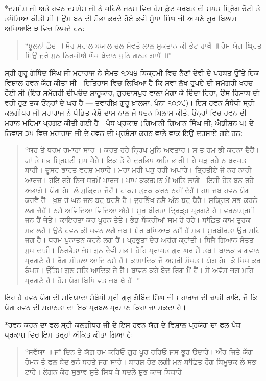 \documentclass[12pt,a5paper,twoside]{book}  %
\makeatletter
\renewcommand\section{\@startsection{section}{1}{0pt}{1.2em}{0.6em}{\punjabifont\Large\bfseries}}%
\makeatother
\begin{document}
{\section*{ਦਸਮੇਸ਼ ਜੀ ਅਤੇ ਹਵਨ}
ਦਸਮੇਸ਼ ਜੀ ਨੇ ਪਹਿਲੇ ਜਨਮ ਵਿਚ ਹੇਮ ਕੁੰਟ ਪਰਬਤ ਦੀ ਸਪਤ ਸ੍ਰਿੰਗ ਚੋਟੀ ਤੇ ਤਪੱਸਿਆ ਕੀਤੀ ਸੀ। ਉਸ ਬਨ ਦੀ ਸ਼ੋਭਾ ਕਰਦੇ ਹੋਏ ਕਵੀ ਸੁੱਖਾ ਸਿੰਘ ਜੀ ਆਪਣੇ ਗੁਰ ਬਿਲਾਸ ਅਧਿਆਇ ੩ ਵਿਚ ਲਿਖਦੇ ਹਨ:
\begin{quote}
“ਝੂਲਨਾਂ ਛੰਦ ॥ ਮੋਰ ਮਰਾਲ ਬਯਾਲ ਚਲ ਸੇਵਤੇ ਲਾਲ ਮੁਕਤਾਨ ਕੀ ਭੇਟ ਰਾਖੈਂ ॥ ਹੋਮ ਯੱਗ ਘ੍ਰਿਤ ਸਿਉਂ ਜੁਰੇ ਮੁਨ ਨਿਰਖੀਐ ਘੋਖ ਬੇਦਾਨ ਧੁਨਿ ਗਨਤ ਗਾਖੈਂ ॥”
\end{quote}
ਸ੍ਰੀ ਗੁਰੂ ਗੋਬਿੰਦ ਸਿੰਘ ਜੀ ਮਹਾਰਾਜ ਨੇ ਸੰਮਤ ੧੭੫੪ ਬਿਕ੍ਰਮੀ ਵਿਚ ਨੈਣਾਂ ਦੇਵੀ ਦੇ ਪਰਬਤ ਉੱਤੇ ਇਕ ਵਿਸ਼ਾਲ ਹਵਨ ਯੱਗ ਕੀਤਾ ਸੀ। ਇਤਿਹਾਸ ਵਿਚ ਲਿਖਿਆ ਹੈ ਕਿ ਸਵਾ ਲੱਖ ਰੁਪਏ ਦੀ ਸਮੱਗਰੀ ਖਰਚ ਹੋਈ ਸੀ (ਇਹ ਸਮੱਗਰੀ ਦੀਪਚੰਦ ਸ਼ਾਹੂਕਾਰ, ਗੁਰਦਾਸਪੁਰ ਵਾਲਾ ਮੰਗਾ ਕੇ ਦਿੰਦਾ ਰਿਹਾ, ਉਸ ਹਿਸਾਬ ਦੀ ਵਹੀ ਹੁਣ ਤਕ ਉਨ੍ਹਾਂ ਦੇ ਘਰ ਹੈ — ਤਵਾਰੀਖ਼ ਗੁਰੂ ਖ਼ਾਲਸਾ, ਪੰਨਾ ੧੦੭੯)। ਇਸ ਹਵਨ ਸੰਬੰਧੀ ਸ੍ਰੀ ਕਲਗੀਧਰ ਜੀ ਮਹਾਰਾਜ ਨੇ ਪੰਡਿਤ ਕੇਸ਼ੋ ਦਾਸ ਨਾਲ ਜੋ ਬਚਨ ਬਿਲਾਸ ਕੀਤੇ, ਉਨ੍ਹਾਂ ਵਿਚ ਹਵਨ ਦੀ ਮਹਾਨ ਮਹਿਮਾ ਪ੍ਰਗਟ ਕੀਤੀ ਗਈ ਹੈ। ਪੰਥ ਪ੍ਰਕਾਸ਼ (ਗਿਆਨੀ ਗਿਆਨ ਸਿੰਘ ਜੀ, ਐਡੀਸ਼ਨ ੫) ਦੇ ਨਿਵਾਸ ੨੫ ਵਿਚ ਮਹਾਰਾਜ ਜੀ ਦੇ ਹਵਨ ਦੀ ਪ੍ਰਸ਼ੰਸਾ ਕਰਨ ਵਾਲੇ ਵਾਕ ਇਉਂ ਦਰਸਾਏ ਗਏ ਹਨ:
\begin{quote}
“ਯਹ ਤੋ ਧਰਮ ਹਮਾਰਾ ਸਾਰ । ਕਰਤ ਰਹੇ ਨ੍ਰਿਪ ਮੁਨਿ ਅਵਤਾਰ। ਸੋ ਤੋ ਹਮ ਭੀ ਕਰਨਾ ਚੈਹੈਂ। ਯਾਂ ਤੇ ਸਭ ਸ੍ਰਿਸ਼ਟੀ ਸੁਖ ਪੈਹੈ। ਇਕ ਤੋ ਹੈ ਦੁਰਭਿਖ ਅਤਿ ਭਾਰੀ। ਹੈ ਪੜੁ ਰਹੈ ਨ ਬਰਖਤ ਬਾਰੀ। ਦੂਸਰ ਭਾਰਤ ਵਰਸ਼ ਮਝਾਰੇ। ਮਹਾ ਮਰੀ ਪੜੁ ਰਹੀ ਅਪਾਰੇ। ਤ੍ਰਿਤੀਏ ਜੋ ਨਰ ਨਾਰੀ ਆਰਜ। ਹੋਇ ਰਹੇ ਨਿਜ ਧਰਮੋਂ ਖਾਰਜ। ਪਾਪ ਕੁਕਰਮਨ ਮੇਂ ਅਤਿ ਲਾਗੇ। ਇਸੀ ਹੇਤ ਬਨ ਰਹੇ ਅਭਾਗੇ। ਯੱਗ ਹੋਮ ਲੌ ਸੁਕ੍ਰਿਤ ਜੋਹੈਂ। ਹਾਕਮ ਤੁਰਕ ਕਰਨ ਨਹੀਂ ਦੈਹੈਂ। ਹਮ ਜਬ ਹਵਨ ਯੱਗ ਕਰਵੈ ਹੈਂ। ਖੁਸ਼ ਹੋ ਘਨ ਜਲ ਬਹੁ ਬਰਸੈ ਹੈ। ਦੁਰਭਿੱਖ ਨਸੈ ਅੰਨ ਬਹੁ ਥੈਹੈ। ਸੁਕ੍ਰਿਤ ਸਭ ਕਰਨੇ ਲਗ ਜੈਹੈਂ। ਨਸੈ ਅਵਿਦਿਆ ਵਿਦਿਆ ਐਹੈ। ਸੂਰ ਬੀਰਤਾ ਦ੍ਰਿੜ੍ਹ ਪ੍ਰਗਟੈ ਹੈ। ਵਰਨਾਸ਼੍ਰਮੀ ਜਨ ਹੈਂ ਜੇਤੇ। ਕਾਇਰਤਾ ਕਰ ਪੂਰਨ ਤੇਤੇ। ਭੇਡ ਬੱਕਰੀਆਂ ਸਮ ਹੋ ਰਹੇ। ਬਾਂਛਿਤ ਕਾਮ ਤੁਰਕ ਸਭ ਲਹੈਂ। ਉਨੈ ਹਵਨ ਕੀ ਪਵਨ ਲਗੈ ਜਬ। ਸ਼ੇਰ ਬਘਿਆੜ ਨਸੈਂ ਹੈਂ ਸਭ। ਸੂਰਬੀਰਤਾ ਉਰ ਮਹਿ ਜਗ ਹੈ। ਧਰਮ ਪੁਨਾਤਨ ਕਰਨੇ ਲਗ ਹੈਂ। ਪ੍ਰਭੁਤਾ ਦੇਹ ਅਰੋਗ ਕ੍ਰਾਂਤੀ। ਬਿਜੈ ਗਿਆਨ ਸੰਤਤ ਸੁਖ ਦਾਤੀ। ਨਿਰਭੈਤਾ ਜੱਸ ਗੁਨ ਦੈਵੀ ਸਭ। ਹੋਹਿ ਪ੍ਰਾਪਤ ਗੁਰ ਘਰ ਮੈਂ ਤਬ। ਬਾਲਕ ਭਾਗਵਾਨ ਪ੍ਰਗਟੈ ਹੈਂ। ਰੋਗ ਸੀਤਲਾ ਆਦਿ ਨਸੈ ਹੈਂ। ਕਾਮਾਦਿਕ ਜੋ ਅਸੁਰੀ ਸੰਪਤ। ਯੱਗ ਹੋਮ ਕੋ ਪਿਖ ਕਰ ਕੰਪਤ। ਉੱਤਮ ਗੁਣ ਸਤਿ ਆਦਿਕ ਜੇ ਹੈਂ। ਬਾਵਨ ਕਹੇ ਬੇਦ ਰਿਗ ਮੈਂ ਹੈਂ। ਸੋ ਅਵੱਸ ਜਗ ਮਹਿ ਪ੍ਰਗਟੈ ਹੈਂ। ਹੋਮ ਯੱਗ ਬਿਧਿ ਵਤ ਜਬ ਥੈ ਹੈਂ।”
\end{quote}
ਇਹ ਹੈ ਹਵਨ ਯੱਗ ਦੀ ਮਰਿਯਾਦਾ ਸੰਬੰਧੀ ਸ੍ਰੀ ਗੁਰੂ ਗੋਬਿੰਦ ਸਿੰਘ ਜੀ ਮਹਾਰਾਜ ਦੀ ਜ਼ਾਤੀ ਰਾਇ, ਜੋ ਕਿ ਯੱਗ ਹਵਨ ਦੀ ਮਹਾਨਤਾ ਦਾ ਇਕ ਪ੍ਰਬਲ ਪ੍ਰਮਾਣ ਕਿਹਾ ਜਾ ਸਕਦਾ ਹੈ।

\section*{ਹਵਨ ਕਰਨ ਦਾ ਫਲ}
ਸ੍ਰੀ ਕਲਗੀਧਰ ਜੀ ਦੇ ਇਸ ਹਵਨ ਯੱਗ ਦੇ ਵਿਸ਼ਾਲ ਪ੍ਰਯੋਗ ਦਾ ਫਲ ਪੰਥ ਪ੍ਰਕਾਸ਼ ਵਿਚ ਇਸ ਤਰ੍ਹਾਂ ਅੰਕਿਤ ਕੀਤਾ ਗਿਆ ਹੈ:
\begin{quote}
“ਸਵੱਯਾ ॥ ਜਾਂ ਦਿਨ ਤੇ ਯੱਗ ਹੋਮ ਕਰਿਓ ਗੁਰ ਪੂਰ ਰਹਿਓ ਜਸ ਭੂਰ ਉਦਾਰੇ। ਔਰ ਜਿਤੇ ਯੱਗ ਹੋਮਨ ਤੇ ਫਲ ਬੇਦ ਭਨੇ ਬਰਤੇ ਜਗ ਸਾਰੇ। ਬਾਰਸ਼ ਹੋਣ ਲਗੀ ਮਨ ਬਾਂਛਿਤ ਰੋਗ ਬਿਮੂਚਕ ਲੌ ਸਭ ਟਾਰੇ। ਲੋਗਨ ਕੇਰ ਸੁਭਾਵ ਸੁਤੇ ਸਿਧ ਥੇ ਬਦਲੇ ਸ਼ੁਭ ਕਾਜ ਬਿਥਾਰੇ।


\end{quote}}
\end{document}
